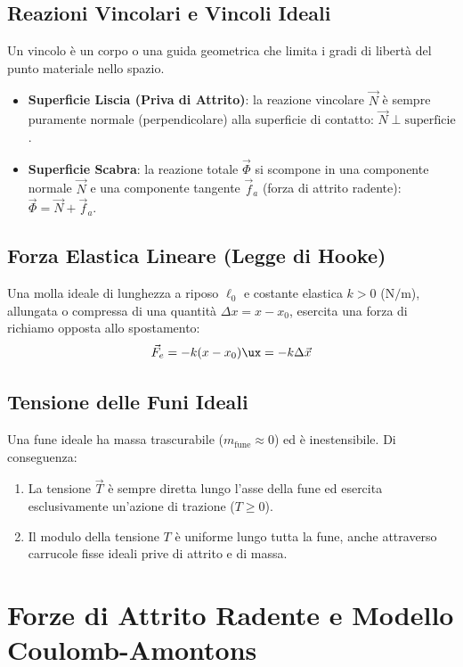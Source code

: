 \subsection{Reazioni Vincolari e Vincoli Ideali}
Un vincolo è un corpo o una guida geometrica che limita i gradi di libertà del punto materiale nello spazio.
\begin{itemize}
    \item \textbf{Superficie Liscia (Priva di Attrito)}: la reazione vincolare $\vec{N}$ è sempre puramente normale (perpendicolare) alla superficie di contatto: $\vec{N} \perp \text{superficie}$.
    \item \textbf{Superficie Scabra}: la reazione totale $\vec{\Phi}$ si scompone in una componente normale $\vec{N}$ e una componente tangente $\vec{f}_a$ (forza di attrito radente): $\vec{\Phi} = \vec{N} + \vec{f}_a$.
\end{itemize}

\subsection{Forza Elastica Lineare (Legge di Hooke)}
Una molla ideale di lunghezza a riposo $\ell_0$ e costante elastica $k > 0$ ($\si{\newton\per\metre}$), allungata o compressa di una quantità $\Delta x = x - x_0$, esercita una forza di richiamo opposta allo spostamento:
\begin{equation}
    \vec{F}_e = -k (x - x_0)\ux = -k \Delta\vec{x}
    \label{eq:hooke}
\end{equation}

\subsection{Tensione delle Funi Ideali}
Una fune ideale ha massa trascurabile ($m_{\text{fune}} \approx 0$) ed è inestensibile. Di conseguenza:
\begin{enumerate}
    \item La tensione $\vec{T}$ è sempre diretta lungo l'asse della fune ed esercita esclusivamente un'azione di trazione ($T \ge 0$).
    \item Il modulo della tensione $T$ è uniforme lungo tutta la fune, anche attraverso carrucole fisse ideali prive di attrito e di massa.
\end{enumerate}

\section{Forze di Attrito Radente e Modello Coulomb-Amontons}
\label{sec:attrito_radente}

